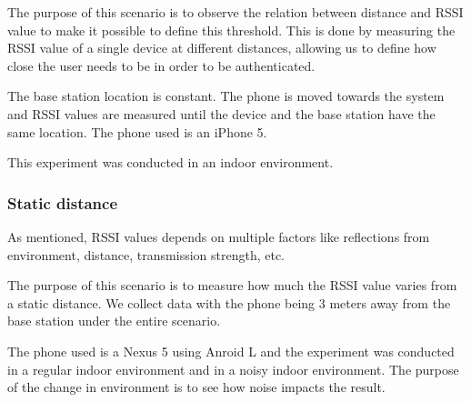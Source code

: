 The purpose of this scenario is to observe the relation between distance and RSSI value to make it possible to  define  this threshold. This is done by measuring the RSSI value of a single device at different distances, allowing us to define how close the user needs to be in order to be authenticated.

The base station location is constant. The phone is moved towards the system and RSSI values are measured until the device and the base station have the same location. The phone used is an iPhone 5.

This experiment was conducted in an indoor environment.


\subsubsection{Static distance}
\label{section:MovingTowardsSystem}
As mentioned, RSSI values depends on multiple factors like reflections from environment, distance, transmission strength, etc. 

The purpose of this scenario is to measure how much the RSSI value varies from a static distance. We collect data with the phone being 3 meters away from the base station under the entire scenario.

The phone used is a Nexus 5 using Anroid L and the experiment was conducted in a regular indoor environment and in a noisy indoor environment. The purpose of the change in environment is to see how noise impacts the result.


